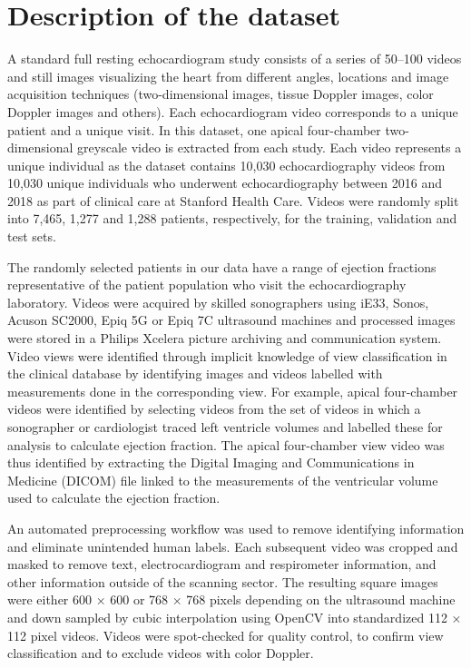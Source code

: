 \section{Description of the dataset}

A standard full resting echocardiogram study consists of a series of 50–100 videos and still images visualizing the heart from different angles, locations and image acquisition techniques (two-dimensional images, tissue Doppler images, color Doppler images and others). Each echocardiogram video corresponds to a unique patient and a unique visit. In this dataset, one apical four-chamber two-dimensional greyscale video is extracted from each study. Each video represents a unique individual as the dataset contains 10,030 echocardiography videos from 10,030 unique individuals who underwent echocardiography between 2016 and 2018 as part of clinical care at Stanford Health Care. Videos were randomly split into 7,465, 1,277 and 1,288 patients, respectively, for the training, validation and test sets.

The randomly selected patients in our data have a range of ejection fractions representative of the patient population who visit the echocardiography laboratory. Videos were acquired by skilled sonographers using iE33, Sonos, Acuson SC2000, Epiq 5G or Epiq 7C ultrasound machines and processed images were stored in a Philips Xcelera picture archiving and communication system. Video views were identified through implicit knowledge of view classification in the clinical database by identifying images and videos labelled with measurements done in the corresponding view. For example, apical four-chamber videos were identified by selecting videos from the set of videos in which a sonographer or cardiologist traced left ventricle volumes and labelled these for analysis to calculate ejection fraction. The apical four-chamber view video was thus identified by extracting the Digital Imaging and Communications in Medicine (DICOM) file linked to the measurements of the ventricular volume used to calculate the ejection fraction.

An automated preprocessing workflow was used to remove identifying information and eliminate unintended human labels. Each subsequent video was cropped and masked to remove text, electrocardiogram and respirometer information, and other information outside of the scanning sector. The resulting square images were either 600 × 600 or 768 × 768 pixels depending on the ultrasound machine and down sampled by cubic interpolation using OpenCV into standardized 112 × 112 pixel videos. Videos were spot-checked for quality control, to confirm view classification and to exclude videos with color Doppler.

